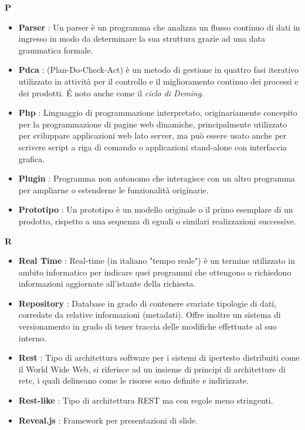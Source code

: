 \newpage
{\huge \textbf{P}}
\begin{flushleft}
\begin{itemize}[label={}]
\item \textbf{Parser} : Un parser è un programma che analizza un flusso continuo di dati in ingresso in modo da determinare la sua struttura grazie ad una data grammatica formale.
\item \textbf{Pdca} : (Plan-Do-Check-Act) è un metodo di gestione in quattro fasi iterativo utilizzato in attività per il controllo e il miglioramento continuo dei processi e dei prodotti. \'E noto anche come il \textit{ciclo di Deming}.
\item \textbf{Php} : Linguaggio di programmazione interpretato, originariamente concepito per la programmazione di pagine web dinamiche, principalmente utilizzato per sviluppare applicazioni web lato server, ma può essere usato anche per scrivere script a riga di comando o applicazioni stand-alone con interfaccia grafica.
\item \textbf{Plugin} : Programma non autonomo che interagisce con un altro programma per ampliarne o estenderne le funzionalità originarie.
\item \textbf{Prototipo} : Un prototipo è un modello originale o il primo esemplare di un prodotto, rispetto a una sequenza di eguali o similari realizzazioni successive.
\end{itemize}
\end{flushleft}
\newpage
{\huge \textbf{R}}
\begin{flushleft}
\begin{itemize}[label={}]
\item \textbf{Real Time} : Real-time (in italiano "tempo reale") è un termine utilizzato in ambito informatico per indicare quei programmi che ottengono o richiedono informazioni aggiornate all'istante della richiesta.
\item \textbf{Repository} : Database in grado di contenere svariate tipologie di dati, corredate da relative informazioni (metadati). Offre inoltre un sistema di versionamento in grado di tener traccia delle modifiche effettuate al suo interno.
\item \textbf{Rest} : Tipo di architettura software per i sistemi di ipertesto distribuiti come il World Wide Web, si riferisce ad un insieme di principi di architetture di rete, i quali delineano come le risorse sono definite e indirizzate.
\item \textbf{Rest-like} : Tipo di architettura REST ma con regole meno stringenti.
\item \textbf{Reveal.js} : Framework per presentazioni di slide.
\end{itemize}
\end{flushleft}
